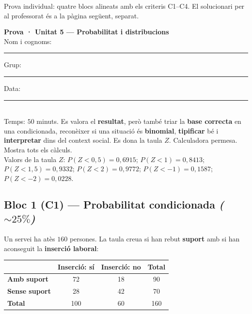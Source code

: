 %
{Prova individual: quatre blocs alineats amb els criteris C1–C4. El solucionari per al professorat és a la pàgina següent, separat.}

\begin{tcolorbox}[colback=white, colframe=udnavy, boxrule=0.8pt, arc=2pt,
  left=8pt, right=8pt, top=6pt, bottom=6pt]
\textbf{Prova · Unitat 5 — Probabilitat i distribucions}\\[4pt]
Nom i cognoms: \rule{6.5cm}{0.4pt} \quad Grup: \rule{1.6cm}{0.4pt} \quad Data: \rule{2.2cm}{0.4pt}\\[6pt]
\small Temps: $50$ minuts. Es valora el \textbf{resultat}, però també triar la
\textbf{base correcta} en una condicionada, reconèixer si una situació és
\textbf{binomial}, \textbf{tipificar} bé i \textbf{interpretar} dins del context social.
Es dona la taula $Z$. Calculadora permesa. Mostra tots els càlculs.\\[4pt]
\footnotesize Valors de la taula $Z$: $P(Z<0,5)=0,6915$; $P(Z<1)=0,8413$;
$P(Z<1,5)=0,9332$; $P(Z<2)=0,9772$; $P(Z<-1)=0,1587$; $P(Z<-2)=0,0228$.
\end{tcolorbox}

\vspace{0.4em}

\subsection*{Bloc 1 (C1) — Probabilitat condicionada \hfill \normalfont\itshape ($\sim 25\%$)}

\noindent Un servei ha atès $160$ persones. La taula creua si han rebut \textbf{suport}
amb si han aconseguit la \textbf{inserció laboral}:
\begin{center}
\renewcommand{\arraystretch}{1.2}
\begin{tabular}{l c c c}
\toprule
 & \textbf{Inserció: sí} & \textbf{Inserció: no} & \textbf{Total} \\
\midrule
\textbf{Amb suport}  & 72  & 18 & 90 \\
\textbf{Sense suport} & 28 & 42 & 70 \\
\midrule
\textbf{Total}       & 100 & 60 & 160 \\
\bottomrule
\end{tabular}
\end{center}

